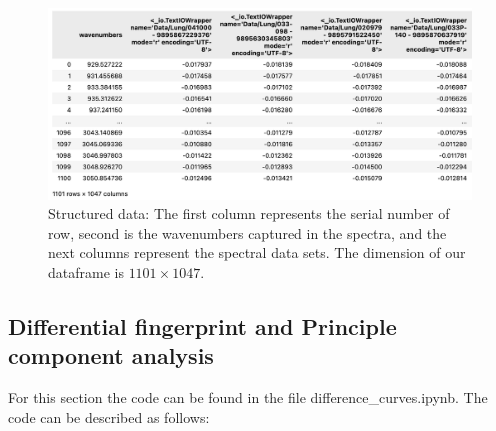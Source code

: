 \documentclass{cernatsnote}
\begin{document}
\begin{figure}[h!]
    \centering
    \includegraphics[width=1\linewidth]{images/DataStructure.png}
    \caption{Structured data: The first column represents the serial number of row, second is the wavenumbers captured in the spectra, and the next columns represent the spectral data sets. The dimension of our dataframe is $1101\times1047$.}
    \label{Data}
\end{figure}









\newpage
\subsection{Differential fingerprint and Principle component analysis}

For this section the code can be found in the file difference\_curves.ipynb. The code can be described as follows:
\end{document}
